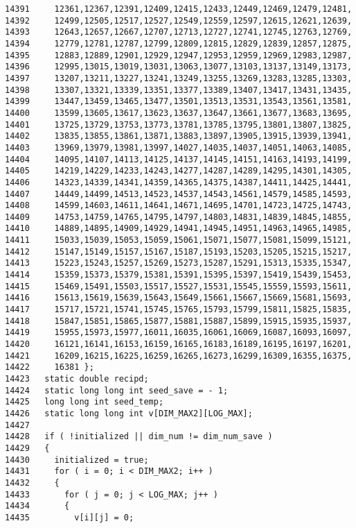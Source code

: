 \begin{Code}
\begin{verbatim}
14391     12361,12367,12391,12409,12415,12433,12449,12469,12479,12481,
14392     12499,12505,12517,12527,12549,12559,12597,12615,12621,12639,
14393     12643,12657,12667,12707,12713,12727,12741,12745,12763,12769,
14394     12779,12781,12787,12799,12809,12815,12829,12839,12857,12875,
14395     12883,12889,12901,12929,12947,12953,12959,12969,12983,12987,
14396     12995,13015,13019,13031,13063,13077,13103,13137,13149,13173,
14397     13207,13211,13227,13241,13249,13255,13269,13283,13285,13303,
14398     13307,13321,13339,13351,13377,13389,13407,13417,13431,13435,
14399     13447,13459,13465,13477,13501,13513,13531,13543,13561,13581,
14400     13599,13605,13617,13623,13637,13647,13661,13677,13683,13695,
14401     13725,13729,13753,13773,13781,13785,13795,13801,13807,13825,
14402     13835,13855,13861,13871,13883,13897,13905,13915,13939,13941,
14403     13969,13979,13981,13997,14027,14035,14037,14051,14063,14085,
14404     14095,14107,14113,14125,14137,14145,14151,14163,14193,14199,
14405     14219,14229,14233,14243,14277,14287,14289,14295,14301,14305,
14406     14323,14339,14341,14359,14365,14375,14387,14411,14425,14441,
14407     14449,14499,14513,14523,14537,14543,14561,14579,14585,14593,
14408     14599,14603,14611,14641,14671,14695,14701,14723,14725,14743,
14409     14753,14759,14765,14795,14797,14803,14831,14839,14845,14855,
14410     14889,14895,14909,14929,14941,14945,14951,14963,14965,14985,
14411     15033,15039,15053,15059,15061,15071,15077,15081,15099,15121,
14412     15147,15149,15157,15167,15187,15193,15203,15205,15215,15217,
14413     15223,15243,15257,15269,15273,15287,15291,15313,15335,15347,
14414     15359,15373,15379,15381,15391,15395,15397,15419,15439,15453,
14415     15469,15491,15503,15517,15527,15531,15545,15559,15593,15611,
14416     15613,15619,15639,15643,15649,15661,15667,15669,15681,15693,
14417     15717,15721,15741,15745,15765,15793,15799,15811,15825,15835,
14418     15847,15851,15865,15877,15881,15887,15899,15915,15935,15937,
14419     15955,15973,15977,16011,16035,16061,16069,16087,16093,16097,
14420     16121,16141,16153,16159,16165,16183,16189,16195,16197,16201,
14421     16209,16215,16225,16259,16265,16273,16299,16309,16355,16375,
14422     16381 };
14423   static double recipd;
14424   static long long int seed_save = - 1;
14425   long long int seed_temp;
14426   static long long int v[DIM_MAX2][LOG_MAX];
14427 
14428   if ( !initialized || dim_num != dim_num_save )
14429   {
14430     initialized = true;
14431     for ( i = 0; i < DIM_MAX2; i++ )
14432     {
14433       for ( j = 0; j < LOG_MAX; j++ )
14434       {
14435         v[i][j] = 0;

\end{verbatim}
\end{Code}
